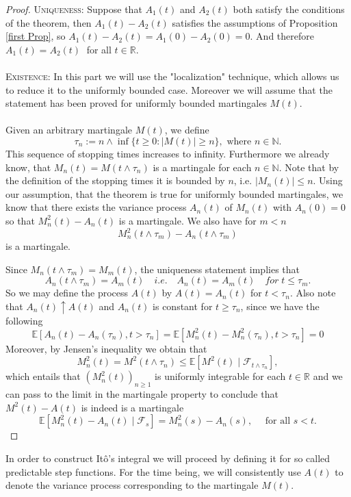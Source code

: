 \documentclass[11pt,a4paper, final]{article}
\begin{document}
\begin{proof}
\textsc{Uniqueness:} Suppose that $A_1(t)$ and $A_2(t)$ both satisfy the conditions of the theorem, then $A_1(t)-A_2(t)$ satisfies the assumptions of Proposition \ref{first Prop}, so $A_1(t)-A_2(t)=A_1(0)-A_2(0)=0$. And therefore $A_1(t)=A_2(t) \;$ for all $t \in \mathbb{R}$. 
\\\\
\textsc{Existence:} In this part we will use the "localization" technique, which allows us to reduce it to the uniformly bounded case. Moreover we will assume that the statement has been proved for uniformly bounded martingales $M(t)$. %
\\\\
Given an arbitrary martingale $M(t)$, we define
$$\tau_n := n \wedge \inf\{t \geq 0: |M(t)|\geq n\}, \text{ where } n \in \mathbb{N}.$$
This sequence of stopping times increases to infinity. Furthermore we already know, that $M_n(t)=M(t \wedge \tau_n)$ is a martingale for each $n \in \mathbb{N}$. Note that by the definition of the stopping times it is bounded by $n$, i.e. $| M_n(t) |\leq n$. Using our assumption, that the theorem is true for uniformly bounded martingales, we know that there exists the variance process $A_n(t)$ of $M_n(t)$ with $A_n(0)=0$ so that $M_n^2(t)-A_n(t)$ is a martingale. We also have for $m<n$ $$M_n^2(t \wedge \tau_m)-A_n(t \wedge \tau_m)$$ is a martingale.
\newpage

\noindent Since $M_n(t \wedge \tau_m)=M_m(t)$, the uniqueness statement implies that 
$$A_n(t \wedge \tau_m)=A_m(t) \quad i.e.\quad  A_n(t)=A_m(t) \quad for \;t\leq \tau_m.$$
So we may define the process $A(t)$ by $A(t)=A_n(t)$ for $t<\tau_n$. Also note that $A_n(t) \uparrow A(t)$ and $A_n(t)$ is constant for $t\geq \tau_n$, since we have the following
$$\mathbb{E}[A_n(t)-A_n(\tau_n), t>\tau_n]= \mathbb{E}[M_n^2(t)-M_n^2(\tau_n), t>\tau_n]=0$$
Moreover, by Jensen's inequality we obtain that
$$M_n^2(t)=M^2(t \wedge \tau_n) \leq \mathbb{E}[M^2(t) \mid \mathscr{F}_{t \wedge \tau_n}],$$
which entails that $(M_n^2(t))_{n\geq 1}$ is uniformly integrable for each $t \in \mathbb{R}$ and we can pass to the limit in the martingale property to conclude that $M^2(t)-A(t)$ is indeed is a martingale
$$\mathbb{E}[M_n^2(t)-A_n(t) \mid \mathscr{F}_s]=M_n^2(s)-A_n(s), \quad \text{ for all }s<t.$$

\end{proof}
\noindent In order to construct Itô's integral we will proceed by defining it for so called predictable step functions. For the time being, we will consistently use $A(t)$ to denote the variance process corresponding to the martingale $M(t)$. 
\end{document}
